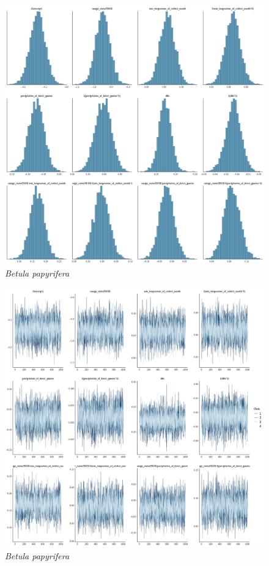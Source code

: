 \documentclass[letterpaper, 12pt]{article}
\begin{document}
\begin{figure}
	\centering
	\includegraphics[scale=0.4]{./19489-BET-PAP_hist}
	\caption{\textit{Betula papyrifera}}
\end{figure}

\begin{figure}
	\centering
	\includegraphics[scale=0.4]{./19489-BET-PAP_traces}
	\caption{\textit{Betula papyrifera}}
\end{figure}
\end{document}

